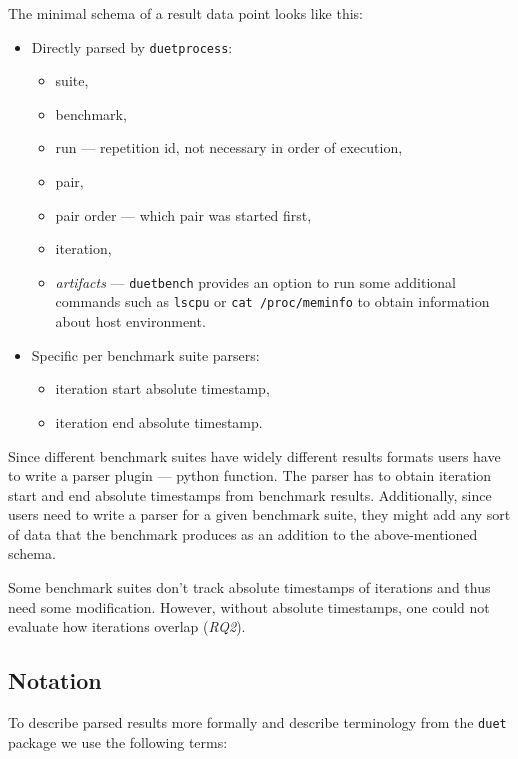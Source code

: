 The minimal schema of a result data point looks like this:
\begin{itemize}
    \item Directly parsed by \lstinline{duetprocess}:
        \begin{itemize}
            \item suite,
            \item benchmark,
            \item run --- repetition id, not necessary in  order of execution,
            \item pair,
            \item pair order --- which pair was started first,
            \item iteration,
            \item \emph{artifacts} --- \lstinline{duetbench} provides an option to run some additional commands such as \lstinline{lscpu} or \lstinline{cat /proc/meminfo} to obtain information about host environment.
        \end{itemize}
    \item Specific per benchmark suite parsers:
        \begin{itemize}
            \item iteration start absolute timestamp,
            \item iteration end absolute timestamp.
        \end{itemize}
\end{itemize}

Since different benchmark suites have widely different results formats users have to write a parser plugin --- python function.
The parser has to obtain iteration start and end absolute timestamps from benchmark results. 
Additionally, since users need to write a parser for a given benchmark suite, they might add any sort of data that the benchmark produces as an addition to the above-mentioned schema.

Some benchmark suites don't track absolute timestamps of iterations and thus need some modification.
However, without absolute timestamps, one could not evaluate how iterations overlap (\emph{RQ2}).

\subsection{Notation}
\label{sec:notation}

To describe parsed results more formally and describe terminology from the \lstinline{duet} package we use the following terms:

